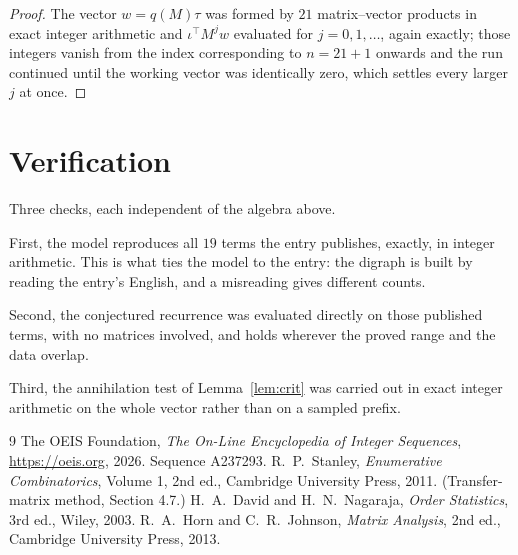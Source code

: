 \documentclass[11pt,a4paper]{article}
\theoremstyle{plain}
\theoremstyle{definition}
\begin{document}
\begin{proof}
The vector $w=q(M)\tau$ was formed by $21$ matrix--vector products in exact integer
arithmetic and $\iota^{\!\top}M^{j}w$ evaluated for $j=0,1,\dots$, again exactly; those
integers vanish from the index corresponding to $n=21+1$ onwards and the run continued
until the working vector was identically zero, which settles every larger $j$ at once.
\end{proof}

\section{Verification}

Three checks, each independent of the algebra above.

First, the model reproduces all $19$ terms the entry publishes, exactly, in integer
arithmetic. This is what ties the model to the entry: the digraph is built by reading the
entry's English, and a misreading gives different counts.

Second, the conjectured recurrence was evaluated directly on those published terms, with no
matrices involved, and holds wherever the proved range and the data overlap.

Third, the annihilation test of Lemma~\ref{lem:crit} was carried out in exact integer
arithmetic on the whole vector rather than on a sampled prefix.

\begin{thebibliography}{9}
 The OEIS Foundation, \emph{The On-Line Encyclopedia of Integer
Sequences}, \url{https://oeis.org}, 2026. Sequence A237293.
 R.~P.~Stanley, \emph{Enumerative Combinatorics}, Volume 1, 2nd ed.,
Cambridge University Press, 2011. (Transfer-matrix method, Section 4.7.)
 H.~A.~David and H.~N.~Nagaraja, \emph{Order Statistics}, 3rd ed., Wiley,
2003.
 R.~A.~Horn and C.~R.~Johnson, \emph{Matrix Analysis}, 2nd ed., Cambridge
University Press, 2013.
\end{thebibliography}
\end{document}
